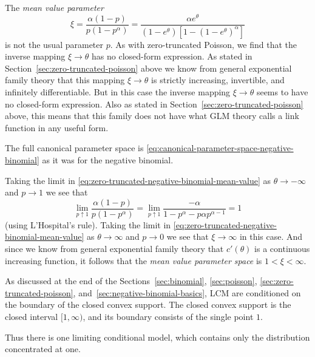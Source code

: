 The \emph{mean value parameter}
\begin{equation} \label{eq:zero-truncated-negative-binomial-mean-value}
   \xi
   =
   \frac{\alpha (1 - p)}{p (1 - p^\alpha)}
   =
   \frac{\alpha e^\theta}{(1 - e^\theta) [1 - (1 - e^\theta)^\alpha]}
\end{equation}
is not the usual parameter $p$.  As with zero-truncated Poisson,
we find that the inverse mapping $\xi \to \theta$ has no closed-form
expression.
As stated in Section~\ref{sec:zero-truncated-poisson} above
we know from general exponential family theory
that this mapping $\xi \to \theta$ is
strictly increasing, invertible, and infinitely differentiable.
But in this case the inverse mapping $\xi \to \theta$ seems to have
no closed-form expression.
Also as stated in Section~\ref{sec:zero-truncated-poisson} above,
this means that this family does not have what GLM theory calls a link function
in any useful form.

The full canonical parameter space is
\eqref{eq:canonical-parameter-space-negative-binomial}
as it was for the negative binomial.

Taking the limit in
\eqref{eq:zero-truncated-negative-binomial-mean-value}
as $\theta \to - \infty$ and $p \to 1$ we see that
$$
   \lim_{p \uparrow 1} \frac{\alpha (1 - p)}{p (1 - p^\alpha)}
   =
   \lim_{p \uparrow 1} \frac{- \alpha}{1 - p^\alpha - p \alpha p^{\alpha - 1}}
   =
   1
$$
(using L'Hospital's rule).
Taking the limit in
\eqref{eq:zero-truncated-negative-binomial-mean-value}
as $\theta \to \infty$ and $p \to 0$ we see that $\xi \to \infty$ in
this case.  And since we know from general exponential family theory
that $c'(\theta)$ is a continuous increasing function, it follows
that the \emph{mean value parameter space} is $1 < \xi < \infty$.

As discussed at the end of the Sections~\ref{sec:binomial},
\ref{sec:poisson}, \ref{sec:zero-truncated-poisson},
and~\ref{sec:negative-binomial-basics},
LCM are conditioned on the boundary of the closed convex support.
The closed convex support is the closed interval $[1, \infty)$, and its
boundary consists of the single point $1$.

Thus there is one limiting conditional model, which contains only
the distribution concentrated at one.

\REVISED

